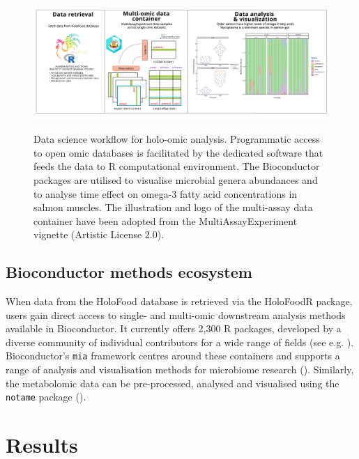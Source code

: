 \documentclass[unnumsec,webpdf,namedate,modern,large]{oup-authoring-template}%
\begin{document}
\vspace{-1em}

\begin{figure}[t]
	\centering
    \includegraphics[width=1\textwidth]{holofoodr_workflow_9.png}
    \label{fig:workflow}
    \caption{Data science workflow for holo-omic analysis. Programmatic access to open omic databases is facilitated by the dedicated software that feeds the data to R computational environment. The Bioconductor packages are utilised to visualise microbial genera abundances and to analyse  time effect on omega-3 fatty acid concentrations in salmon muscles. The illustration and logo of the multi-assay data container have been adopted from the MultiAssayExperiment vignette (Artistic License 2.0).}
	\label{fig:workflow}
\end{figure}

\vspace{-1em}
\subsection{Bioconductor methods ecosystem}

When data from the HoloFood database is retrieved via the HoloFoodR package, users gain direct access to single- and multi-omic downstream analysis methods available in Bioconductor. It currently offers 2,300 R packages, developed by a diverse community of individual contributors for a wide range of fields (see e.g. \cite{gentleman_bioconductor_2004,callahan_bioconductor_2016,amezquita_orchestrating_2020,drnevich_2025}). Bioconductor's \texttt{mia} framework centres around these containers and supports a range of analysis and visualisation methods for microbiome research (\cite{mia, miaViz, oma}). Similarly, the metabolomic data can be pre-processed, analysed and visualised using the \texttt{notame} package (\cite{klavus_2020}).

\section{Results}
\end{document}
